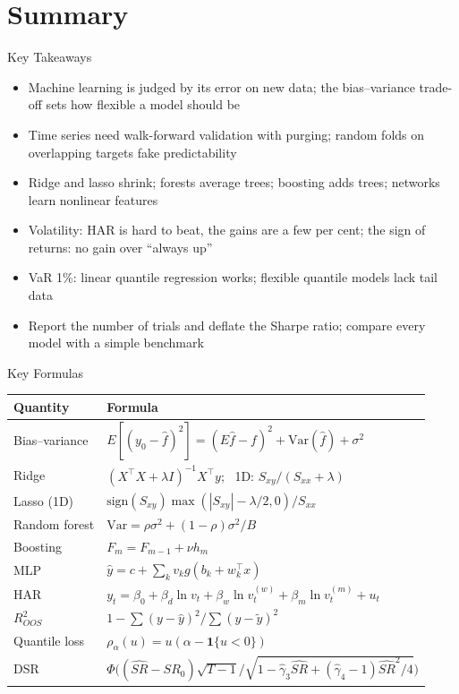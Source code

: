 \section{Summary}

\begin{frame}{Key Takeaways}
\itemsize{\small}
\begin{itemize}
    \item Machine learning is judged by its error on new data; the bias--variance trade-off sets how flexible a model should be
    \item Time series need walk-forward validation with purging; random folds on overlapping targets fake predictability
    \item Ridge and lasso shrink; forests average trees; boosting adds trees; networks learn nonlinear features
    \item Volatility: HAR is hard to beat, the gains are a few per cent; the sign of returns: no gain over ``always up''
    \item VaR 1\%: linear quantile regression works; flexible quantile models lack tail data
    \item Report the number of trials and deflate the Sharpe ratio; compare every model with a simple benchmark
\end{itemize}
\end{frame}

\begin{frame}{Key Formulas}
\itemsize{\small}
{\renewcommand{\arraystretch}{1.45}\begin{center}
\scriptsize
\begin{tabular}{ll}
\toprule
\textbf{Quantity} & \textbf{Formula} \\
\midrule
Bias--variance & $E[(y_0 - \hat f)^2] = (E\hat f - f)^2 + \mathrm{Var}(\hat f) + \sigma^2$ \\
Ridge & $(X^\top X + \lambda I)^{-1}X^\top y$; \ 1D: $S_{xy}/(S_{xx} + \lambda)$ \\
Lasso (1D) & $\mathrm{sign}(S_{xy})\max(|S_{xy}| - \lambda/2, 0)/S_{xx}$ \\
Random forest & $\mathrm{Var} = \rho\sigma^2 + (1 - \rho)\sigma^2/B$ \\
Boosting & $F_m = F_{m-1} + \nu h_m$ \\
MLP & $\hat y = c + \sum_k v_k g(b_k + w_k^\top x)$ \\
HAR & $y_t = \beta_0 + \beta_d\ln v_t + \beta_w\ln v_t^{(w)} + \beta_m\ln v_t^{(m)} + u_t$ \\
$R^2_{OOS}$ & $1 - \sum(y - \hat y)^2/\sum(y - \tilde y)^2$ \\
Quantile loss & $\rho_\alpha(u) = u(\alpha - \mathbf{1}\{u < 0\})$ \\
DSR & $\Phi\big((\widehat{SR} - SR_0)\sqrt{T - 1}/\sqrt{1 - \hat\gamma_3\widehat{SR} + (\hat\gamma_4 - 1)\widehat{SR}^2/4}\big)$ \\
\bottomrule
\end{tabular}
\end{center}
}
\end{frame}

